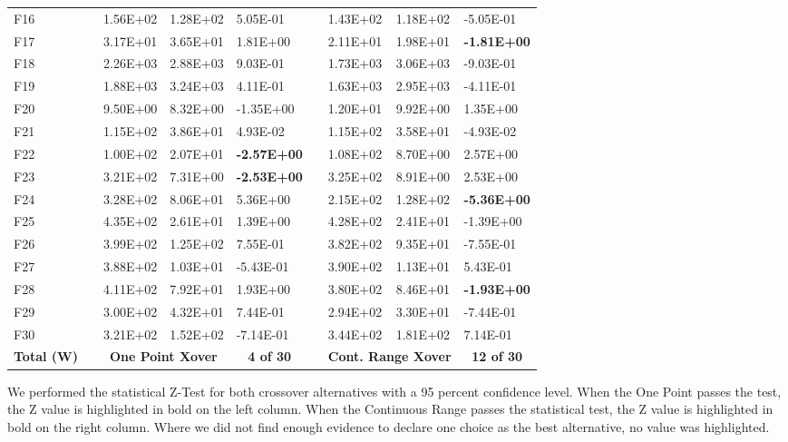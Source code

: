\documentclass[graybox]{svmult}
\begin{document}
\begin{table}[]
\begin{tabular}{@{}lllllllll@{}}
    F16 &  & 1.56E+02 & 1.28E+02 & 5.05E-01 &  & 1.43E+02 & 1.18E+02 & -5.05E-01 \\
    F17 &  & 3.17E+01 & 3.65E+01 & 1.81E+00 &  & 2.11E+01 & 1.98E+01 & \textbf{-1.81E+00} \\
    F18 &  & 2.26E+03 & 2.88E+03 & 9.03E-01 &  & 1.73E+03 & 3.06E+03 & -9.03E-01 \\
    F19 &  & 1.88E+03 & 3.24E+03 & 4.11E-01 &  & 1.63E+03 & 2.95E+03 & -4.11E-01 \\
    F20 &  & 9.50E+00 & 8.32E+00 & -1.35E+00 &  & 1.20E+01 & 9.92E+00 & 1.35E+00 \\
    F21 &  & 1.15E+02 & 3.86E+01 & 4.93E-02 &  & 1.15E+02 & 3.58E+01 & -4.93E-02 \\
    F22 &  & 1.00E+02 & 2.07E+01 & \textbf{-2.57E+00} &  & 1.08E+02 & 8.70E+00 & 2.57E+00 \\
    F23 &  & 3.21E+02 & 7.31E+00 & \textbf{-2.53E+00} &  & 3.25E+02 & 8.91E+00 & 2.53E+00 \\
    F24 &  & 3.28E+02 & 8.06E+01 & 5.36E+00 &  & 2.15E+02 & 1.28E+02 & \textbf{-5.36E+00} \\
    F25 &  & 4.35E+02 & 2.61E+01 & 1.39E+00 &  & 4.28E+02 & 2.41E+01 & -1.39E+00 \\
    F26 &  & 3.99E+02 & 1.25E+02 & 7.55E-01 &  & 3.82E+02 & 9.35E+01 & -7.55E-01 \\
    F27 &  & 3.88E+02 & 1.03E+01 & -5.43E-01 &  & 3.90E+02 & 1.13E+01 & 5.43E-01 \\
    F28 &  & 4.11E+02 & 7.92E+01 & 1.93E+00 &  & 3.80E+02 & 8.46E+01 & \textbf{-1.93E+00} \\
    F29 &  & 3.00E+02 & 4.32E+01 & 7.44E-01 &  & 2.94E+02 & 3.30E+01 & -7.44E-01 \\
    F30 &  & 3.21E+02 & 1.52E+02 & -7.14E-01 &  & 3.44E+02 & 1.81E+02 & 7.14E-01 \\
    \textbf{Total (W)} &  & \multicolumn{2}{c}{\textbf{One Point Xover}} & \multicolumn{1}{c}{\textbf{4 of 30}} &  & \multicolumn{2}{c}{\textbf{Cont. Range Xover}} & \multicolumn{1}{c}{\textbf{12 of 30}} \\ \bottomrule
    \end{tabular}
    \end{table}

    \FloatBarrier

    We performed the statistical Z-Test for both crossover alternatives with a 95 percent confidence level. When the One Point passes the test, the Z value is highlighted in bold on the left column. When the Continuous Range passes the statistical test, the Z value is highlighted in bold on the right column. Where we did not find enough evidence to declare one choice as the best alternative, no value was highlighted.
\end{document}
